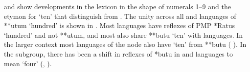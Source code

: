  and  show developments in the lexicon
in the shape of numerals 1--9
and the etymon for ‘ten’ that distinguish  from .
The unity across all 
and  languages of **utum ‘hundred’ is shown in .
Most  languages have reflexes of
PMP *Ratus ‘hundred’ and not **utum, and most also share **butu ‘ten’ with  languages.
In the larger context most  languages of the
 node also have ‘ten’ from **butu ( ).
In the  subgroup,
there has been a shift in reflexes of *butu in 
and  languages to mean ‘four’
(\citealp[367]{Fricke2019},  ).

